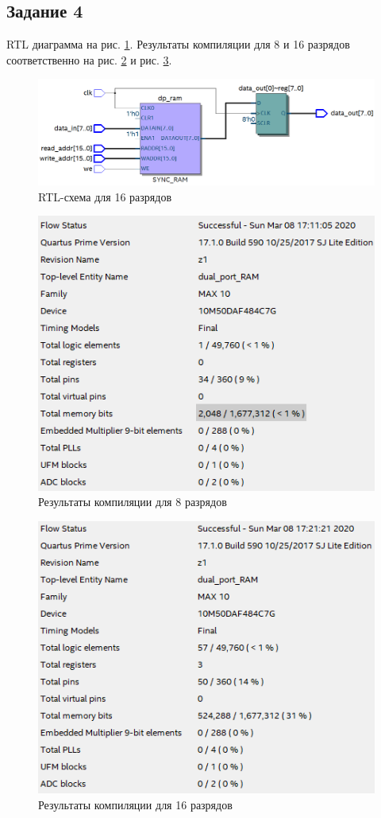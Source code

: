 \documentclass[a4paper,14pt]{article}
\begin{document}
	\subsection{Задание 4}
	
	RTL диаграмма на рис. \ref{fig:z4_rtl_16bit}. Результаты компиляции для 8 и 16 разрядов соответственно на рис. \ref{fig:z4_res_8bit} и рис. \ref{fig:z4_res_16bit}.
	
	\begin{figure}[H]
		\centering
		\includegraphics[width=0.8\linewidth]{images/z4_rtl_16bit}
		\caption{RTL-схема для 16 разрядов}
		\label{fig:z4_rtl_16bit}
	\end{figure}
	
	\begin{figure}[H]
		\centering
		\includegraphics[width=0.7\linewidth]{images/z4_res_8bit}
		\caption{Результаты компиляции для 8 разрядов}
		\label{fig:z4_res_8bit}
	\end{figure}
	
	\begin{figure}[H]
		\centering
		\includegraphics[width=0.7\linewidth]{images/z4_res_16bit}
		\caption{Результаты компиляции для 16 разрядов}
		\label{fig:z4_res_16bit}
	\end{figure}
	
\end{document}
